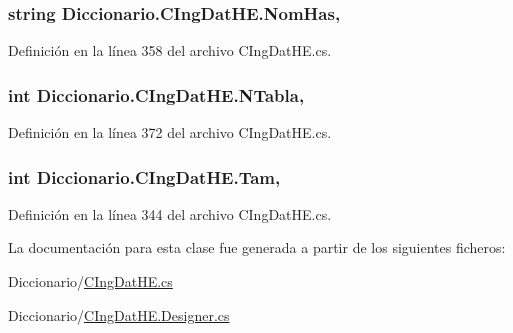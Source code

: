 \hypertarget{class_diccionario_1_1_c_ing_dat_h_e_aaebba742bbc0cd1db58970dcfcfc7458}{
\subsubsection[{Nom\-Has}]{\setlength{\rightskip}{0pt plus 5cm}string Diccionario.\-C\-Ing\-Dat\-H\-E.\-Nom\-Has\hspace{0.3cm}{\ttfamily [get]}, {\ttfamily [set]}}}\label{class_diccionario_1_1_c_ing_dat_h_e_aaebba742bbc0cd1db58970dcfcfc7458}


Definición en la línea 358 del archivo C\-Ing\-Dat\-H\-E.\-cs.

\hypertarget{class_diccionario_1_1_c_ing_dat_h_e_a2b174cbc4709ba0781addc2f86542303}{
\subsubsection[{N\-Tabla}]{\setlength{\rightskip}{0pt plus 5cm}int Diccionario.\-C\-Ing\-Dat\-H\-E.\-N\-Tabla\hspace{0.3cm}{\ttfamily [get]}, {\ttfamily [set]}}}\label{class_diccionario_1_1_c_ing_dat_h_e_a2b174cbc4709ba0781addc2f86542303}


Definición en la línea 372 del archivo C\-Ing\-Dat\-H\-E.\-cs.

\hypertarget{class_diccionario_1_1_c_ing_dat_h_e_a43943d6e7a0c8c7c4475f651f64aed58}{
\subsubsection[{Tam}]{\setlength{\rightskip}{0pt plus 5cm}int Diccionario.\-C\-Ing\-Dat\-H\-E.\-Tam\hspace{0.3cm}{\ttfamily [get]}, {\ttfamily [set]}}}\label{class_diccionario_1_1_c_ing_dat_h_e_a43943d6e7a0c8c7c4475f651f64aed58}


Definición en la línea 344 del archivo C\-Ing\-Dat\-H\-E.\-cs.



La documentación para esta clase fue generada a partir de los siguientes ficheros\-:\begin{DoxyCompactItemize}
\item 
Diccionario/\hyperlink{_c_ing_dat_h_e_8cs}{C\-Ing\-Dat\-H\-E.\-cs}\item 
Diccionario/\hyperlink{_c_ing_dat_h_e_8_designer_8cs}{C\-Ing\-Dat\-H\-E.\-Designer.\-cs}\end{DoxyCompactItemize}
